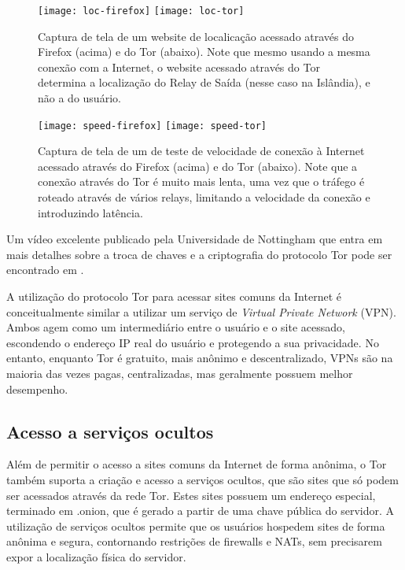 \begin{figure}
    \centering
    \texttt{[image: loc-firefox]}
    \texttt{[image: loc-tor]}
  
    \caption{Captura de tela de um website de localicação acessado através do Firefox (acima) e do Tor (abaixo). Note que mesmo usando a mesma conexão com a Internet, o website acessado através do Tor determina a localização do Relay de Saída (nesse caso na Islândia), e não a do usuário.}
\end{figure}

\begin{figure}
    \centering
    \texttt{[image: speed-firefox]}
    \texttt{[image: speed-tor]}
  
    \caption{Captura de tela de um de teste de velocidade de conexão à Internet acessado através do Firefox (acima) e do Tor (abaixo). Note que a conexão através do Tor é muito mais lenta, uma vez que o tráfego é roteado através de vários relays, limitando a velocidade da conexão e introduzindo latência.}
\end{figure}

Um vídeo excelente publicado pela Universidade de Nottingham que entra em mais detalhes sobre a troca de chaves e a criptografia do protocolo Tor pode ser encontrado em \cite{computerphile-tor}.

A utilização do protocolo Tor para acessar sites comuns da Internet é conceitualmente similar a utilizar um serviço de \textit{Virtual Private Network} (VPN). Ambos agem como um intermediário entre o usuário e o site acessado, escondendo o endereço IP real do usuário e protegendo a sua privacidade. No entanto, enquanto Tor é gratuito, mais anônimo e descentralizado, VPNs são na maioria das vezes pagas, centralizadas, mas geralmente possuem melhor desempenho.

\subsection{Acesso a serviços ocultos}

Além de permitir o acesso a sites comuns da Internet de forma anônima, o Tor também suporta a criação e acesso a serviços ocultos, que são sites que só podem ser acessados através da rede Tor. Estes sites possuem um endereço especial, terminado em .onion, que é gerado a partir de uma chave pública do servidor. A utilização de serviços ocultos permite que os usuários hospedem sites de forma anônima e segura, contornando restrições de firewalls e NATs, sem precisarem expor a localização física do servidor.

